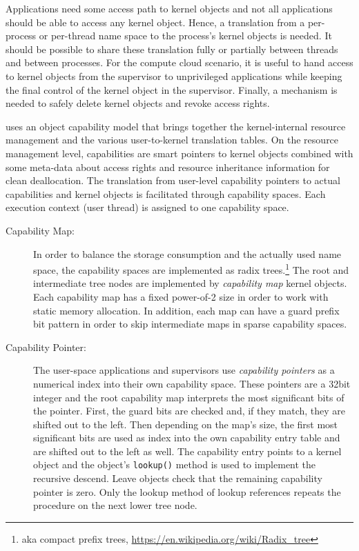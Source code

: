Applications need some access path to kernel objects and not all applications should be able to access any kernel object. Hence, a translation from a per-process or per-thread name space to the process's kernel objects is needed. It should be possible to share these translation fully or partially between threads and between processes. For the compute cloud scenario, it is useful to hand access to kernel objects from the supervisor to unprivileged applications while keeping the final control of the kernel object in the supervisor. Finally, a mechanism is needed to safely delete kernel objects and revoke access rights.

\mythos uses an object capability model that brings together the kernel-internal resource management and the various user-to-kernel translation tables. On the resource management level, capabilities are smart pointers to kernel objects combined with some meta-data about access rights and resource inheritance information for clean deallocation. The translation from user-level capability pointers to actual capabilities and kernel objects is facilitated through capability spaces. Each execution context (user thread) is assigned to one capability space. 

\begin{description}
\item[Capability Map:] In order to balance the storage consumption and the actually used name space, the capability spaces are implemented as radix trees.\footnote{aka compact prefix trees, \url{https://en.wikipedia.org/wiki/Radix_tree}} The root and intermediate tree nodes are implemented by \emph{capability map} kernel objects. 
Each capability map has a fixed power-of-2 size in order to work with static memory allocation. In addition, each map can have a guard prefix bit pattern in order to skip intermediate maps in sparse capability spaces.

\item[Capability Pointer:] The user-space applications and supervisors use \emph{capability pointers} as a numerical index into their own capability space. These pointers are a 32bit integer and the root capability map interprets the most significant bits of the pointer. First, the guard bits are checked and, if they match, they are shifted out to the left. Then depending on the map's size, the first most significant bits are used as index into the own capability entry table and are shifted out to the left as well. The capability entry points to a kernel object and the object's \texttt{lookup()} method is used to implement the recursive descend. Leave objects check that the remaining capability pointer is zero. Only the lookup method of lookup references repeats the procedure on the next lower tree node.  
\end{description}

